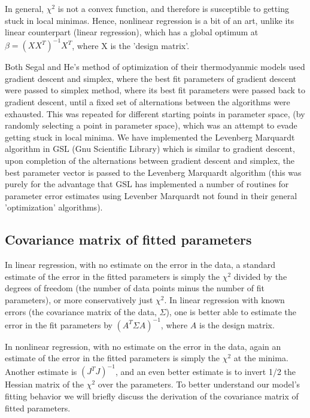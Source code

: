 In general, $\chi^2$ is not a convex function, and therefore is susceptible to getting stuck in local minimas.  Hence, nonlinear regression is a bit of an art\cite{press_etal:1996}, unlike its linear counterpart (linear regression), which has a global optimum at $\beta=(XX^T)^{-1}X^T$, where X is the 'design matrix'.

Both Segal and He's method of optimization of their thermodyanmic models used gradient descent and simplex, where the best fit parameters of gradient descent were passed to simplex method, where its best fit parameters were passed back to gradient descent, until a fixed set of alternations between the algorithms were exhausted.  This was repeated for different starting points in parameter space, (by randomly selecting a point in parameter space), which was an attempt to evade getting stuck in local minima.  We have implemented the Levenberg Marquardt algorithm in GSL (Gnu Scientific Library) which is similar to gradient descent, upon completion of the alternations between gradient descent and simplex, the best parameter vector is passed to the Levenberg Marquardt algorithm (this was purely for the advantage that GSL has implemented a number of routines for parameter error estimates using Levenber Marquardt not found in their general 'optimization' algorithms).

\subsection{Covariance matrix of fitted parameters}
In linear regression, with no estimate on the error in the data, a standard estimate of the error in the fitted parameters is simply the $\chi^2$ divided by the degrees of freedom (the number of data points minus the number of fit parameters), or more conservatively just $\chi^2$.  In linear regression with known errors (the covariance matrix of the data, $\Sigma$), one is better able to estimate the error in the fit parameters by $(A^T\Sigma A)^{-1}$, where $A$ is the design matrix.

In nonlinear regression, with no estimate on the error in the data, again an estimate of the error in the fitted parameters is simply the $\chi^2$ at the minima.  Another estimate is $(J^TJ)^{-1}$, and an even better estimate is to invert 1/2 the Hessian matrix of the $\chi^2$ over the parameters.  To better understand our model's fitting behavior we will briefly discuss the derivation of the covariance matrix of fitted parameters.

